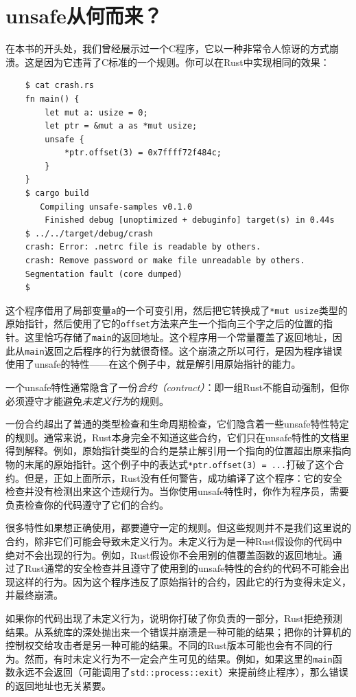 \section{unsafe从何而来？}
在本书的开头处，我们曾经展示过一个C程序，它以一种非常令人惊讶的方式崩溃。这是因为它违背了C标准的一个规则。你可以在Rust中实现相同的效果：

\begin{verbatim}
    $ cat crash.rs
    fn main() {
        let mut a: usize = 0;
        let ptr = &mut a as *mut usize;
        unsafe {
            *ptr.offset(3) = 0x7ffff72f484c;
        }
    }
    $ cargo build
       Compiling unsafe-samples v0.1.0
        Finished debug [unoptimized + debuginfo] target(s) in 0.44s
    $ ../../target/debug/crash
    crash: Error: .netrc file is readable by others.
    crash: Remove password or make file unreadable by others.
    Segmentation fault (core dumped)
    $
\end{verbatim}

这个程序借用了局部变量\texttt{a}的一个可变引用，然后把它转换成了\texttt{*mut usize}类型的原始指针，然后使用了它的\texttt{offset}方法来产生一个指向三个字之后的位置的指针。这里恰巧存储了\texttt{main}的返回地址。这个程序用一个常量覆盖了返回地址，因此从\texttt{main}返回之后程序的行为就很奇怪。这个崩溃之所以可行，是因为程序错误使用了unsafe的特性——在这个例子中，就是解引用原始指针的能力。

一个unsafe特性通常隐含了一份\emph{合约（contract）}：即一组Rust不能自动强制，但你必须遵守才能避免\emph{未定义行为}的规则。

一份合约超出了普通的类型检查和生命周期检查，它们隐含着一些unsafe特性特定的规则。通常来说，Rust本身完全不知道这些合约，它们只在unsafe特性的文档里得到解释。例如，原始指针类型的合约是禁止解引用一个指向的位置超出原来指向物的末尾的原始指针。这个例子中的表达式\texttt{*ptr.offset(3) = ...}打破了这个合约。但是，正如上面所示，Rust没有任何警告，成功编译了这个程序：它的安全检查并没有检测出来这个违规行为。当你使用unsafe特性时，你作为程序员，需要负责检查你的代码遵守了它们的合约。

很多特性如果想正确使用，都要遵守一定的规则。但这些规则并不是我们这里说的合约，除非它们可能会导致未定义行为。未定义行为是一种Rust假设你的代码中绝对不会出现的行为。例如，Rust假设你不会用别的值覆盖函数的返回地址。通过了Rust通常的安全检查并且遵守了使用到的unsafe特性的合约的代码不可能会出现这样的行为。因为这个程序违反了原始指针的合约，因此它的行为变得未定义，并最终崩溃。

如果你的代码出现了未定义行为，说明你打破了你负责的一部分，Rust拒绝预测结果。从系统库的深处抛出来一个错误并崩溃是一种可能的结果；把你的计算机的控制权交给攻击者是另一种可能的结果。不同的Rust版本可能也会有不同的行为。然而，有时未定义行为不一定会产生可见的结果。例如，如果这里的\texttt{main}函数永远不会返回（可能调用了\texttt{std::process::exit}）来提前终止程序），那么错误的返回地址也无关紧要。

